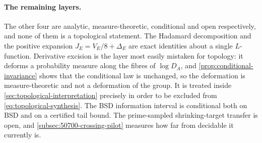 \documentclass[11pt,reqno]{amsart}
\theoremstyle{remark}
\begin{document}
\paragraph{The remaining layers.}
The other four are analytic, measure-theoretic, conditional and open respectively, and none of them is a topological statement.  The Hadamard decomposition and the positive expansion $J_E=V_E/8+\Delta_E$ are exact identities about a single $L$-function.  Derivative excision is the layer most easily mistaken for topology: it deforms a probability measure along the fibres of $\log D_A$, and \cref{prop:conditional-invariance} shows that the conditional law is unchanged, so the deformation is measure-theoretic and not a deformation of the group.  It is treated inside \cref{sec:topological-interpretation} precisely in order to be excluded from \eqref{eq:topological-synthesis}.  The BSD information interval is conditional both on BSD and on a certified tail bound.  The prime-sampled shrinking-target transfer is open, and \cref{subsec:50700-crossing-pilot} measures how far from decidable it currently is.
\end{document}
